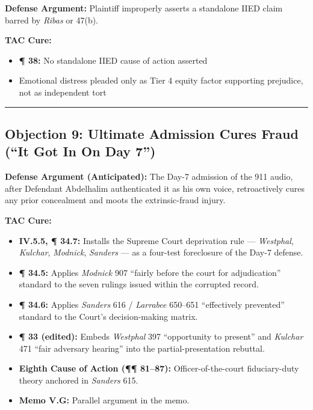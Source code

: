 \textbf{Defense Argument:} Plaintiff improperly asserts a standalone IIED claim barred by \emph{Ribas} or \textsection{} 47(b).

\textbf{TAC Cure:}

\begin{itemize}
\tightlist
\item
  \textbf{¶ 38:} No standalone IIED cause of action asserted
\item
  Emotional distress pleaded only as Tier 4 equity factor supporting prejudice, not as independent tort
\end{itemize}

\begin{center}\rule{0.5\linewidth}{0.5pt}\end{center}

\subsection{Objection 9: Ultimate Admission Cures Fraud (``It Got In On Day 7'')}\label{objection-9-ultimate-admission-cures-fraud-it-got-in-on-day-7}

\textbf{Defense Argument (Anticipated):} The Day-7 admission of the 911 audio, after Defendant Abdelhalim authenticated it as his own voice, retroactively cures any prior concealment and moots the extrinsic-fraud injury.

\textbf{TAC Cure:}

\begin{itemize}
\tightlist
\item
  \textbf{\textsection{}IV.5.5, ¶ 34.7:} Installs the Supreme Court deprivation rule --- \emph{Westphal}, \emph{Kulchar}, \emph{Modnick}, \emph{Sanders} --- as a four-test foreclosure of the Day-7 defense.
\item
  \textbf{¶ 34.5:} Applies \emph{Modnick} 907 ``fairly before the court for adjudication'' standard to the seven rulings issued within the corrupted record.
\item
  \textbf{¶ 34.6:} Applies \emph{Sanders} 616 / \emph{Larrabee} 650--651 ``effectively prevented'' standard to the Court's decision-making matrix.
\item
  \textbf{¶ 33 (edited):} Embeds \emph{Westphal} 397 ``opportunity to present'' and \emph{Kulchar} 471 ``fair adversary hearing'' into the partial-presentation rebuttal.
\item
  \textbf{Eighth Cause of Action (¶¶ 81--87):} Officer-of-the-court fiduciary-duty theory anchored in \emph{Sanders} 615.
\item
  \textbf{Memo \textsection{} V.G:} Parallel argument in the memo.
\end{itemize}

